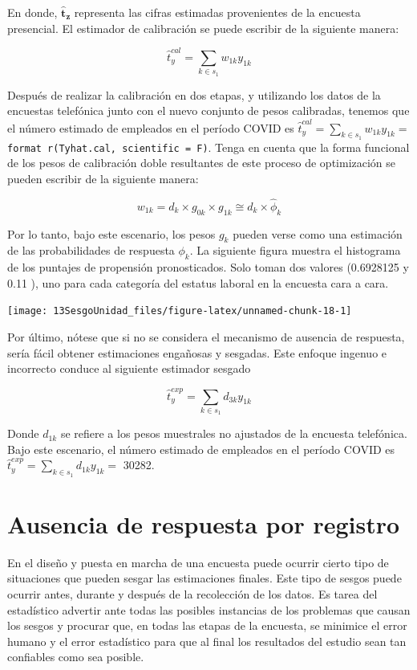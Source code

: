 \documentclass[
  12pt,
  spanish,
]{book}
\begin{document}
En donde, \(\hat{\mathbf{t}}_\mathbf{z}\) representa las cifras estimadas provenientes de la encuesta presencial. El estimador de calibración se puede escribir de la siguiente manera:

\[
\hat{t}_y^{cal}=\sum_{k\in s_1}w_{1k}y_{1k}
\]

Después de realizar la calibración en dos etapas, y utilizando los datos de la encuestas telefónica junto con el nuevo conjunto de pesos calibradas, tenemos que el número estimado de empleados en el período COVID es \(\hat{t}_y^{cal}=\sum_{k\in s_1}w_{1k}y_{1k}=\) \texttt{format\ r(Tyhat.cal,\ scientific\ =\ F)}. Tenga en cuenta que la forma funcional de los pesos de calibración doble resultantes de este proceso de optimización se pueden escribir de la siguiente manera:

\[
w_{1k} = d_k \times g_{0k} \times g_{1k} \cong d_k \times \hat \phi_k
\]

Por lo tanto, bajo este escenario, los pesos \(g_k\) pueden verse como una estimación de las probabilidades de respuesta \(\phi_k\). La siguiente figura muestra el histograma de los puntajes de propensión pronosticados. Solo toman dos valores (0.6928125 y 0.11 ), uno para cada categoría del estatus laboral en la encuesta cara a cara.

\begin{center}\texttt{[image: 13SesgoUnidad\_files/figure-latex/unnamed-chunk-18-1]} \end{center}

Por último, nótese que si no se considera el mecanismo de ausencia de respuesta, sería fácil obtener estimaciones engañosas y sesgadas. Este enfoque ingenuo e incorrecto conduce al siguiente estimador sesgado

\[
\hat{t}_y^{exp}=\sum_{k\in s_1}d_{3k}y_{1k}
\]

Donde \(d_{1k}\) se refiere a los pesos muestrales no ajustados de la encuesta telefónica. Bajo este escenario, el número estimado de empleados en el período COVID es \(\hat{t}_y^{exp}=\sum_{k\in s_1}d_{1k}y_{1k} =\) 30282.

\hypertarget{ausencia-de-respuesta-por-registro}{%
\chapter{Ausencia de respuesta por registro}\label{ausencia-de-respuesta-por-registro}}

En el diseño y puesta en marcha de una encuesta puede ocurrir cierto tipo de situaciones que pueden sesgar las estimaciones finales. Este tipo de sesgos puede ocurrir antes, durante y después de la recolección de los datos. Es tarea del estadístico advertir ante todas las posibles instancias de los problemas que causan los sesgos y procurar que, en todas las etapas de la encuesta, se minimice el error humano y el error estadístico para que al final los resultados del estudio sean tan confiables como sea posible.
\end{document}
